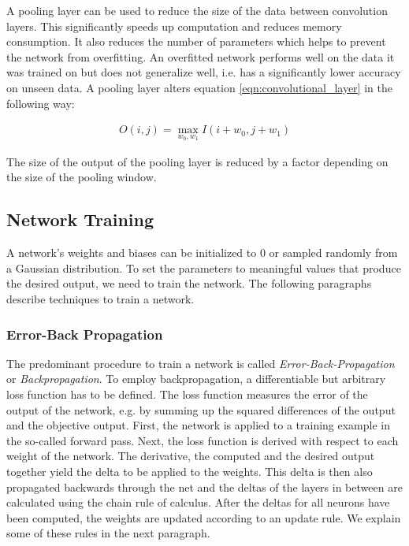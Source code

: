 A pooling layer can be used to reduce the size of the data between convolution layers. This significantly speeds up computation and reduces memory consumption. It also reduces the number of parameters which helps to prevent the network from overfitting. An overfitted network performs well on the data it was trained on but does not generalize well, i.e. has a significantly lower accuracy on unseen data. A pooling layer alters equation \ref{eqn:convolutional_layer} in the following way:

\begin{align}
O(i, j) = \max\limits_{w_0, w_1} I(i + w_0, j + w_1)
\end{align} 

The size of the output of the pooling layer is reduced by a factor depending on the size of the pooling window.

\subsection{Network Training} \label{section:network_training}

A network's weights and biases can be initialized to 0 or sampled randomly from a Gaussian distribution. To set the parameters to meaningful values that produce the desired output, we need to train the network. The following paragraphs describe techniques to train a network.

\subsubsection{Error-Back Propagation} The predominant procedure to train a network is called \textit{Error-Back-Propagation} or \textit{Backpropagation}. To employ backpropagation, a differentiable but arbitrary loss function has to be defined. The loss function measures the error of the output of the network, e.g. by summing up the squared differences of the output and the objective output. First, the network is applied to a training example in the so-called forward pass. Next, the loss function is derived with respect to each weight of the network. The derivative, the computed and the desired output together yield the delta to be applied to the weights. This delta is then also propagated backwards through the net and the deltas of the layers in between are calculated using the chain rule of calculus. After the deltas for all neurons have been computed, the weights are updated according to an update rule. We explain some of these rules in the next paragraph. 

